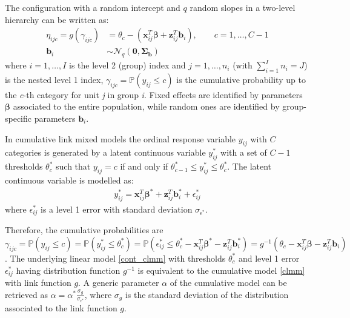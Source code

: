 The configuration with a random intercept and \(q\) random slopes in a two-level hierarchy can be written as:
\begin{equation}
    \label{clmm}
    \begin{aligned}
        \eta_{ijc} = g(\gamma_{ijc}) &= \theta_{c} - (\bm{x}_{ij}^T \bm{\beta} + \bm{z}_{ij}^T \bm{b}_{i}),\qquad c=1,\dots,C-1 \\
        \bm{b}_{i} &\sim \mathcal{N}_q(\bm{0},\bm{\Sigma_{b}})
    \end{aligned}
\end{equation}
where $i=1,\dots,I$ is the level 2 (group) index and $j=1,\dots,n_{i}$ (with \(\sum_{i=1}^{I} n_{i}=J\)) is the nested level 1 index, $\gamma_{ijc} = \mathbb{P}(y_{ij} \leq c)$ is the cumulative probability up to the \textit{c}-th category for unit \textit{j} in group \textit{i}.
Fixed effects are identified by parameters \(\bm{\beta}\) associated to the entire population, while random ones are identified by group-specific parameters \(\bm{b}_{i}\).

In cumulative link mixed models the ordinal response variable \(y_{ij}\) with \(C\) categories is generated by a latent continuous variable \(y^*_{ij}\)  with a set of \(C-1\) thresholds \(\theta^*_{c}\) such that \(y_{ij}=c\) if and only if \(\theta^*_{c-1} \leq y^*_{ij} \leq \theta^*_{c}\).
The latent continuous variable is modelled as:
\begin{equation}
    \label{cont_clmm}
    \begin{aligned}
        y^*_{ij} = \bm{x}^{T}_{ij} \bm{\beta^*} + \bm{z}_{ij}^T \bm{b}^*_{i} + \epsilon^*_{ij}
    \end{aligned}
\end{equation}
where \(\epsilon^*_{ij}\) is a level 1 error with standard deviation \(\sigma_{\epsilon^*}\).

Therefore, the cumulative probabilities are \(\gamma_{ijc} = \mathbb{P}(y_{ij} \leq c) = \mathbb{P}(y^*_{ij} \leq \theta^*_{c}) = \mathbb{P}(\epsilon^*_{ij} \leq \theta^*_{c} - \bm{x}^{T}_{ij} \bm{\beta^*} - \bm{z}_{ij}^T \bm{b}^*_{i}) = g^{-1}(\theta_{c} - \bm{x}^{T}_{ij} \bm{\beta} - \bm{z}_{ij}^T \bm{b}_{i})\).
The underlying linear model \eqref{cont_clmm} with thresholds \(\theta^*_{c}\) and level 1 error \(\epsilon^*_{ij}\) having distribution function \(g^{-1}\) is equivalent to the cumulative model \eqref{clmm} with link function \(g\).
A generic parameter \(\alpha\) of the cumulative model can be retrieved as \(\alpha = \alpha^* \frac{\sigma_{g}}{\sigma_{\epsilon^*}}\), where \(\sigma_{g}\) is the standard deviation of the distribution associated to the link function \(g\).

